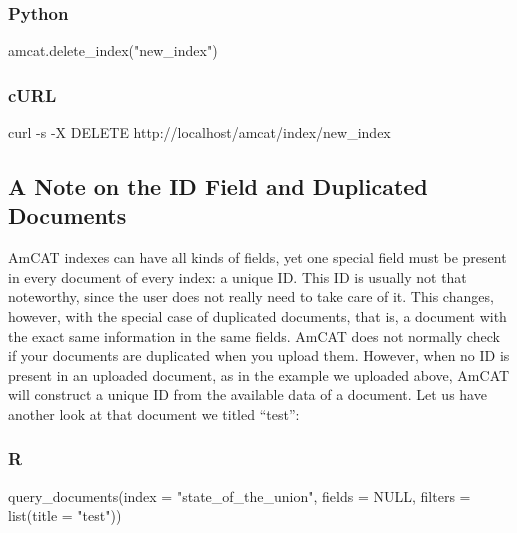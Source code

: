 \documentclass[
  letterpaper,
  DIV=11,
  numbers=noendperiod]{scrreprt}
\newenvironment{Shaded}{\begin{snugshade}}{\end{snugshade}}
\newcommand{\AttributeTok}[1]{\textcolor[rgb]{0.40,0.45,0.13}{#1}}
\newcommand{\ConstantTok}[1]{\textcolor[rgb]{0.56,0.35,0.01}{#1}}
\newcommand{\ExtensionTok}[1]{\textcolor[rgb]{0.00,0.23,0.31}{#1}}
\newcommand{\FunctionTok}[1]{\textcolor[rgb]{0.28,0.35,0.67}{#1}}
\newcommand{\NormalTok}[1]{\textcolor[rgb]{0.00,0.23,0.31}{#1}}
\newcommand{\StringTok}[1]{\textcolor[rgb]{0.13,0.47,0.30}{#1}}
\begin{document}
\subsubsection{Python}

\begin{Shaded}
\begin{Highlighting}[]
\NormalTok{amcat.delete\_index(}\StringTok{"new\_index"}\NormalTok{)}
\end{Highlighting}
\end{Shaded}

\subsubsection{cURL}

\begin{Shaded}
\begin{Highlighting}[]
\ExtensionTok{curl} \AttributeTok{{-}s} \AttributeTok{{-}X}\NormalTok{ DELETE http://localhost/amcat/index/new\_index}
\end{Highlighting}
\end{Shaded}

\subsection{A Note on the ID Field and Duplicated
Documents}\label{a-note-on-the-id-field-and-duplicated-documents}

AmCAT indexes can have all kinds of fields, yet one special field must
be present in every document of every index: a unique ID. This ID is
usually not that noteworthy, since the user does not really need to take
care of it. This changes, however, with the special case of duplicated
documents, that is, a document with the exact same information in the
same fields. AmCAT does not normally check if your documents are
duplicated when you upload them. However, when no ID is present in an
uploaded document, as in the example we uploaded above, AmCAT will
construct a unique ID from the available data of a document. Let us have
another look at that document we titled ``test'':

\subsubsection{R}

\begin{Shaded}
\begin{Highlighting}[]
\FunctionTok{query\_documents}\NormalTok{(}\AttributeTok{index =} \StringTok{"state\_of\_the\_union"}\NormalTok{, }\AttributeTok{fields =} \ConstantTok{NULL}\NormalTok{, }\AttributeTok{filters =} \FunctionTok{list}\NormalTok{(}\AttributeTok{title =} \StringTok{"test"}\NormalTok{))}
\end{Highlighting}
\end{Shaded}
\end{document}
